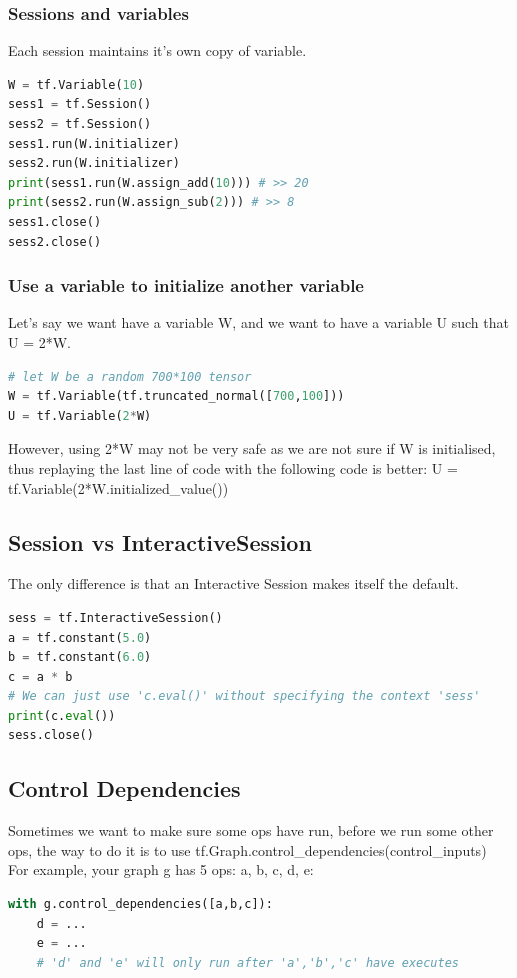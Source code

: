 \documentclass{article}
\begin{document}
	\subsubsection{Sessions and variables}
	Each session maintains it's own copy of variable.
\begin{lstlisting}[language=Python,morekeywords ={as}]
W = tf.Variable(10)
sess1 = tf.Session()
sess2 = tf.Session()
sess1.run(W.initializer)
sess2.run(W.initializer)
print(sess1.run(W.assign_add(10))) # >> 20
print(sess2.run(W.assign_sub(2))) # >> 8
sess1.close()
sess2.close()
\end{lstlisting}
	\subsubsection{Use a variable to initialize another variable}
	Let's say we want have a variable W, and we want to have a variable U such that U = 2*W.
\begin{lstlisting}[language=Python,morekeywords ={as}]
# let W be a random 700*100 tensor
W = tf.Variable(tf.truncated_normal([700,100]))
U = tf.Variable(2*W)
\end{lstlisting}	
	However, using 2*W may not be very safe as we are not sure if W is initialised, thus replaying the last line of code with the following code is better: \colorbox{backcolour}{U = tf.Variable(2*W.initialized\_value())}
	\medskip
	\subsection{Session vs InteractiveSession}
	The only difference is that an Interactive Session makes itself the default.
\begin{lstlisting}[language=Python,morekeywords ={as}]
sess = tf.InteractiveSession()
a = tf.constant(5.0)
b = tf.constant(6.0)
c = a * b
# We can just use 'c.eval()' without specifying the context 'sess'
print(c.eval())
sess.close()
\end{lstlisting}
	\medskip	
	\subsection{Control Dependencies}
	Sometimes we want to make sure some ops have run, before we run some other ops, the way to do it is to use \colorbox{backcolour}{tf.Graph.control\_dependencies(control\_inputs)}\\
For example, your graph g has 5 ops: a, b, c, d, e:
\begin{lstlisting}[language=Python,morekeywords ={as}]
with g.control_dependencies([a,b,c]):
	d = ...
	e = ...
	# 'd' and 'e' will only run after 'a','b','c' have executes
\end{lstlisting}	
	\medskip	
\end{document}
